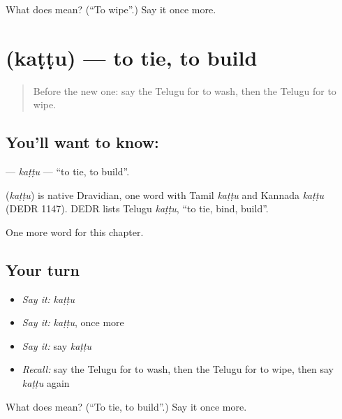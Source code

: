 \begin{tcolorbox}[breakable,colback=teal!4,colframe=teal!35!black,title={Before you move on}]
What does  mean? (\textquotedblleft{}To wipe\textquotedblright{}.) Say it once more.
\end{tcolorbox}
\section[\texorpdfstring{\te{కట్టు} (kaṭṭu)}{కట్టు (kaṭṭu)}]{ (kaṭṭu) — to tie, to build}

\label{lesson:TE-C147-kattu}



\begin{quote}
Before the new one: say the Telugu for to wash, then the Telugu for to wipe.
\end{quote}

\subsection*{You'll want to know: }
\textbf{} — \emph{kaṭṭu} — \textquotedblleft{}to tie, to build\textquotedblright{}.

\begin{cousinweb}
\textbf{} (\emph{kaṭṭu}) is native Dravidian, one word with Tamil \emph{kaṭṭu} and Kannada \emph{kaṭṭu} (DEDR 1147). DEDR lists Telugu \emph{kaṭṭu}, \textquotedblleft{}to tie, bind, build\textquotedblright{}.
\end{cousinweb}

\begin{grammarlens}[title={What you've built}]
One more word for this chapter.
\end{grammarlens}

\subsection*{Your turn}
\begin{itemize}
\raggedright
  \item \emph{Say it:} \emph{kaṭṭu}
  \item \emph{Say it:} \emph{kaṭṭu}, once more
  \item \emph{Say it:} say \emph{kaṭṭu}
  \item \emph{Recall:} say the Telugu for to wash, then the Telugu for to wipe, then say \emph{kaṭṭu} again
\end{itemize}

\begin{tcolorbox}[breakable,colback=teal!4,colframe=teal!35!black,title={Before you move on}]
What does  mean? (\textquotedblleft{}To tie, to build\textquotedblright{}.) Say it once more.
\end{tcolorbox}
